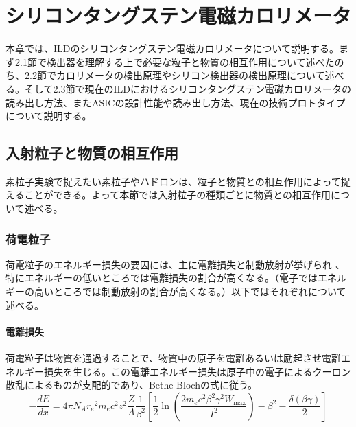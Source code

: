 
\chapter{シリコンタングステン電磁カロリメータ} \label{sec:1.Siwecal}
本章では、ILDのシリコンタングステン電磁カロリメータについて説明する。まず2.1節で検出器を理解する上で必要な粒子と物質の相互作用について述べたのち、2.2節でカロリメータの検出原理やシリコン検出器の検出原理について述べる。そして2.3節で現在のILDにおけるシリコンタングステン電磁カロリメータの読み出し方法、またASICの設計性能や読み出し方法、現在の技術プロトタイプについて説明する。
\section{入射粒子と物質の相互作用}
素粒子実験で捉えたい素粒子やハドロンは、粒子と物質との相互作用によって捉えることができる。よって本節では入射粒子の種類ごとに物質との相互作用について述べる。
\subsection{荷電粒子}
荷電粒子のエネルギー損失の要因には、主に電離損失と制動放射が挙げられ \cite{blue}、特にエネルギーの低いところでは電離損失の割合が高くなる。（電子ではエネルギーの高いところでは制動放射の割合が高くなる。）以下ではそれぞれについて述べる。
\subsubsection{電離損失}
荷電粒子は物質を通過することで、物質中の原子を電離あるいは励起させ電離エネルギー損失を生じる。この電離エネルギー損失は原子中の電子によるクーロン散乱によるものが支配的であり、Bethe-Blochの式に従う。
\begin{equation}
-\frac{dE}{dx} = 4\pi N_A {r_e}^2 m_e c^2 z^2 \frac{Z}{A} \frac{1}{{\beta}^2} \left[ \frac{1}{2} \ln(\frac{2m_e c^2{\beta}^2{\gamma}^2W_{\mathrm{max}}}{I^2}) -{\beta}^2 - \frac{\delta(\beta \gamma)}{2} \right]
\end{equation}

